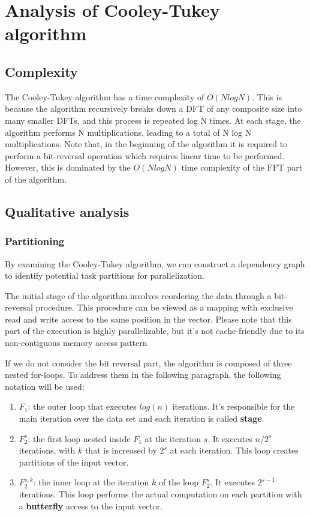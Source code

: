 \documentclass[12pt]{article}
\begin{document}
\pagebreak
\section{Analysis of Cooley-Tukey algorithm}
\subsection{Complexity}
The Cooley-Tukey algorithm has a time complexity of $O(N log N)$. This is because the algorithm recursively breaks down a DFT of any composite size into many smaller DFTs, and this process is repeated log N times. At each stage, the algorithm performs N multiplications, leading to a total of N log N multiplications. Note that, in the beginning of the algorithm it is required to perform a bit-reversal operation which requires linear time to be performed. However, this is dominated by the $O(N log N)$ time complexity of the FFT part of the algorithm.

\subsection{Qualitative analysis}
\subsubsection{Partitioning}
By examining the Cooley-Tukey algorithm, we can construct a dependency graph to identify potential task partitions for parallelization.



The initial stage of the algorithm involves reordering the data through a bit-reversal procedure. This procedure can be viewed as a mapping with exclusive read and write access to the same position in the vector. Please note that this part of the execution is highly parallelizable, but it's not cache-friendly due to its non-contiguous memory access pattern

\bigskip


\noindent If we do not consider the bit reversal part, the algorithm is composed of three nested for-loops. To address them in the following paragraph, the following notation will be used:

\begin{enumerate}
   \item $F_1$: the outer loop that executes $log(n)$ iterations. It's responsible for the main iteration over the data set and each iteration is called \textbf{stage}.
   \item $F^{s}_2$: the first loop nested inside $F_1$ at the iteration $s$. It executes $n/2^s$ iterations, with $k$ that is increased by $2^s$ at each iteration. This loop creates partitions of the input vector.
   \item $F^{s,k}_2$: the inner loop at the iteration $k$ of the loop $F^{s}_2$. It executes $2^{s-1}$ iterations. This loop performs the actual computation on each partition with a \textbf{butterfly} access to the input vector.
\end{enumerate}
\end{document}
